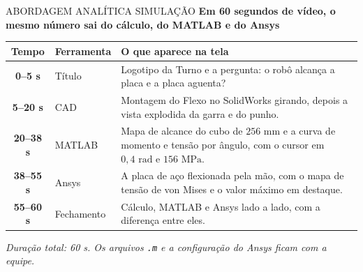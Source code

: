 \documentclass[aspectratio=169, 10pt]{beamer}
\newcommand{\currentpresenter}{Rodrigo}
\newcommand{\setpresenter}[1]{\renewcommand{\currentpresenter}{#1}}
\begin{document}
	\setpresenter{João}
	\begin{frame}{ABORDAGEM ANALÍTICA SIMULAÇÃO}
		\textbf{\normalsize Em 60 segundos de vídeo, o mesmo número sai do cálculo, do MATLAB e do Ansys}
		\vspace{0.18cm}
		
		\footnotesize
		\begin{tabularx}{\textwidth}{c l X}
			\toprule
			\textbf{Tempo} & \textbf{Ferramenta} & \textbf{O que aparece na tela} \\
			\midrule
			\textbf{0--5 s} & Título & Logotipo da Turno e a pergunta: o robô alcança a placa e a placa aguenta? \\
			\addlinespace
			\textbf{5--20 s} & CAD & Montagem do Flexo no SolidWorks girando, depois a vista explodida da garra e do punho. \\
			\addlinespace
			\textbf{20--38 s} & MATLAB & Mapa de alcance do cubo de $256\text{ mm}$ e a curva de momento e tensão por ângulo, com o cursor em $0,4\text{ rad}$ e $156\text{ MPa}$. \\
			\addlinespace
			\textbf{38--55 s} & Ansys & A placa de aço flexionada pela mão, com o mapa de tensão de von Mises e o valor máximo em destaque. \\
			\addlinespace
			\textbf{55--60 s} & Fechamento & Cálculo, MATLAB e Ansys lado a lado, com a diferença entre eles. \\
			\bottomrule
		\end{tabularx}
		
		\vspace{0.22cm}
		\scriptsize\textit{Duração total: 60 s. Os arquivos \texttt{.m} e a configuração do Ansys ficam com a equipe.}		
	\end{frame}
	
\end{document}
